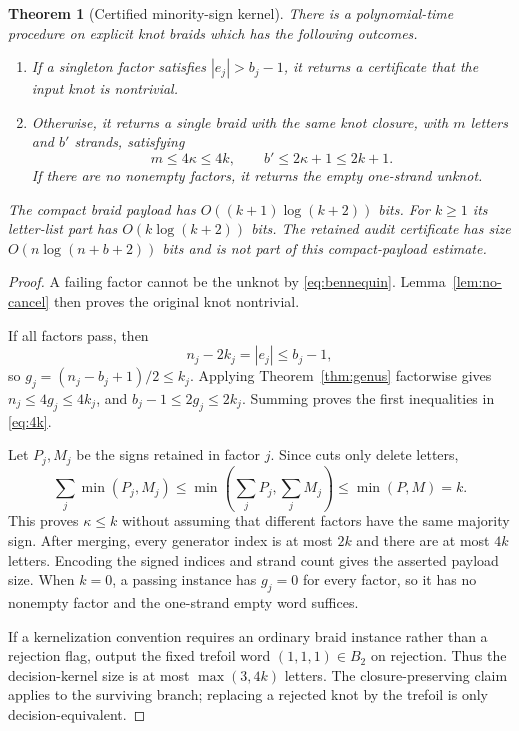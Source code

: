 \documentclass[11pt,letterpaper]{article}
\newtheorem{theorem}{Theorem}[section]
\theoremstyle{definition}
\begin{document}
\begin{theorem}[Certified minority-sign kernel]
\label{thm:minority}
There is a polynomial-time procedure on explicit knot braids which has the following outcomes.
\begin{enumerate}[label=(\roman*)]
\item If a singleton factor satisfies $|e_j|>b_j-1$, it returns a certificate that the input knot is nontrivial.
\item Otherwise, it returns a single braid with the same knot closure, with $m$ letters and $b'$ strands, satisfying
\begin{equation}
 m\le4\kappa\le4k,\qquad b'\le2\kappa+1\le2k+1.
 \label{eq:4k}
\end{equation}
If there are no nonempty factors, it returns the empty one-strand unknot.
\end{enumerate}
The compact braid payload has $O((k+1)\log(k+2))$ bits. For $k\ge1$ its letter-list part has $O(k\log(k+2))$ bits. The retained audit certificate has size $O(n\log(n+b+2))$ bits and is not part of this compact-payload estimate.
\end{theorem}
\begin{proof}
A failing factor cannot be the unknot by \eqref{eq:bennequin}. Lemma~\ref{lem:no-cancel} then proves the original knot nontrivial.

If all factors pass, then
\[
 n_j-2k_j=|e_j|\le b_j-1,
\]
so $g_j=(n_j-b_j+1)/2\le k_j$. Applying Theorem~\ref{thm:genus} factorwise gives $n_j\le4g_j\le4k_j$, and $b_j-1\le2g_j\le2k_j$. Summing proves the first inequalities in \eqref{eq:4k}.

Let $P_j,M_j$ be the signs retained in factor $j$. Since cuts only delete letters,
\[
 \sum_j\min(P_j,M_j)\le\min\!\left(\sum_j P_j,\sum_j M_j\right)
 \le\min(P,M)=k.
\]
This proves $\kappa\le k$ without assuming that different factors have the same majority sign. After merging, every generator index is at most $2k$ and there are at most $4k$ letters. Encoding the signed indices and strand count gives the asserted payload size. When $k=0$, a passing instance has $g_j=0$ for every factor, so it has no nonempty factor and the one-strand empty word suffices.

If a kernelization convention requires an ordinary braid instance rather than a rejection flag, output the fixed trefoil word $(1,1,1)\in B_2$ on rejection. Thus the decision-kernel size is at most $\max(3,4k)$ letters. The closure-preserving claim applies to the surviving branch; replacing a rejected knot by the trefoil is only decision-equivalent.
\end{proof}
\end{document}
